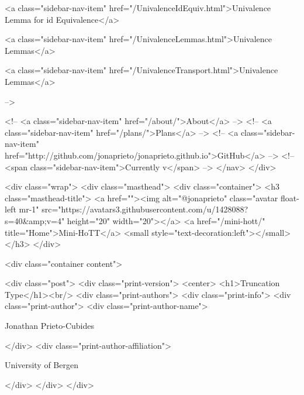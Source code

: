       
    
      
        
          <a class="sidebar-nav-item" href="/UnivalenceIdEquiv.html">Univalence Lemma for id Equivalence</a>
        
      
    
      
        
          <a class="sidebar-nav-item" href="/UnivalenceLemmas.html">Univalence Lemmas</a>
        
      
    
      
        
          <a class="sidebar-nav-item" href="/UnivalenceTransport.html">Univalence Lemmas</a>
        
      
     -->

    <!-- <a class="sidebar-nav-item" href="/about/">About</a> -->
    <!-- <a class="sidebar-nav-item" href="/plans/">Plans</a> -->
    <!-- <a class="sidebar-nav-item" href="http://github.com/jonaprieto/jonaprieto.github.io">GitHub</a> -->
    <!-- <span class="sidebar-nav-item">Currently v</span> -->
  </nav>
</div>

    <div class="wrap">
      <div class="masthead">
        <div class="container">
          <h3 class="masthead-title">
            <a href=""><img alt="@jonaprieto" class="avatar float-left mr-1" src="https://avatars3.githubusercontent.com/u/1428088?s=40&amp;v=4" height="20" width="20"></a>
            <a href="/mini-hott/" title="Home">Mini-HoTT</a>
            <small style="text-decoration:left"></small>
          </h3>
        </div>
      
      <div class="container content">
        







<div class="post">
  <div class="print-version">
    <center>
      <h1>Truncation Type</h1><br/>
        <div class="print-authors">
          <div class="print-info">
            <div class="print-author">
              <div class="print-author-name">
                
                  Jonathan Prieto-Cubides
                
              </div>
              <div class="print-author-affiliation">
                
                  University of Bergen
                
                </div>
            </div>
          </div>
          
